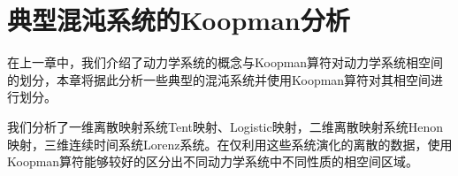 \chapter{典型混沌系统的Koopman分析}
在上一章中，我们介绍了动力学系统的概念与Koopman算符对动力学系统相空间的划分，本章将据此分析一些典型的混沌系统并使用Koopman算符对其相空间进行划分。

我们分析了一维离散映射系统Tent映射、Logistic映射，二维离散映射系统Henon映射，三维连续时间系统Lorenz系统。在仅利用这些系统演化的离散的数据，使用Koopman算符能够较好的区分出不同动力学系统中不同性质的相空间区域。








% 
% 
